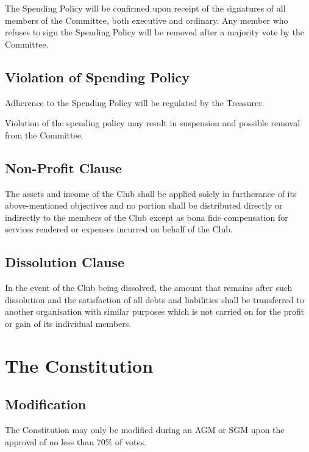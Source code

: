 \documentclass[a4paper,12pt]{article}
\begin{document}
The Spending Policy will be confirmed upon receipt of the signatures of all members of the Committee, both executive and ordinary. Any member who refuses to sign the Spending Policy will be removed after a majority vote by the Committee.

\subsection{Violation of Spending Policy}

Adherence to the Spending Policy will be regulated by the Treasurer.

Violation of the spending policy may result in suspension and possible removal from the Committee.

\subsection{Non-Profit Clause}

The assets and income of the Club shall be applied solely in furtherance of its above-mentioned objectives and no portion shall be distributed directly or indirectly to the members of the Club except as bona fide compensation for services rendered or expenses incurred on behalf of the Club.

\subsection{Dissolution Clause}

In the event of the Club being dissolved, the amount that remains after such dissolution and the satisfaction of all debts and liabilities shall be transferred to another organisation with similar purposes which is not carried on for the profit or gain of its individual members.

\section{The Constitution}

\subsection{Modification}

The Constitution may only be modified during an AGM or SGM upon the approval of no less than 70\% of votes.
\end{document}
